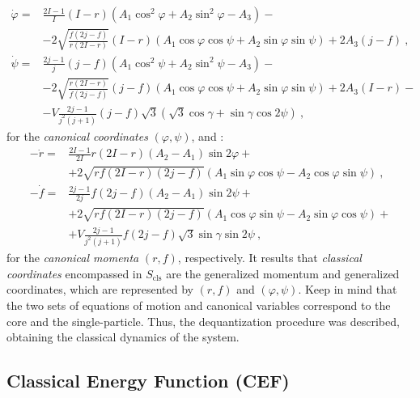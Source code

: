 \begin{align}
    \dot{\varphi}=&\frac{2I-1}{I}(I-r)\left(A_1\cos^2\varphi+A_2\sin^2\varphi-A_3\right)-\nonumber\\
                &-2\sqrt{\frac{f(2j-f)}{r(2I-r)}}(I-r)\left(A_1\cos\varphi\cos\psi+A_2\sin\varphi\sin\psi\right)+2A_3(j-f)\ ,\nonumber\\
    \dot{\psi}=&\frac{2j-1}{j}(j-f)\left(A_1\cos^2\psi+A_2\sin^2\psi-A_3\right)-\nonumber\\
                &-2\sqrt{\frac{r(2I-r)}{f(2j-f)}}(j-f)\left(A_1\cos\varphi\cos\psi+A_2\sin\varphi\sin\psi\right)+2A_3(I-r)-\nonumber\\
                &-V\frac{2j-1}{j^2(j+1)}(j-f)\sqrt{3}\left(\sqrt{3}\cos\gamma+\sin\gamma\cos2\psi\right)\ ,
    \label{eq-of-motion-explicit-coordinates}
\end{align}
for the \emph{canonical coordinates} $(\varphi,\psi)$, and \cite{raduta2020approach}:
\begin{align}
    -\dot{r}=&\frac{2I-1}{2I}r(2I-r)(A_2-A_1)\sin2\varphi+\nonumber\\
                &+2\sqrt{rf(2I-r)(2j-f)}\left(A_1\sin\varphi\cos\psi-A_2\cos\varphi\sin\psi\right)\ ,\nonumber\\
    -\dot{f}=&\frac{2j-1}{2j}f(2j-f)(A_2-A_1)\sin2\psi+\nonumber\\
                &+2\sqrt{rf(2I-r)(2j-f)}\left(A_1\cos\varphi\sin\psi-A_2\sin\varphi\cos\psi\right)+\nonumber\\
                &+V\frac{2j-1}{j^2(j+1)}f(2j-f)\sqrt{3}\sin\gamma\sin2\psi\ ,
    \label{eq-of-motion-explicit-momenta}
\end{align}
for the \emph{canonical momenta} $(r,f)$, respectively. It results that \emph{classical coordinates} encompassed in $S_\text{cls}$ are the generalized momentum and generalized coordinates, which are represented by $(r,f)$ and $(\varphi,\psi)$. Keep in mind that the two sets of equations of motion and canonical variables correspond to the core and the single-particle. Thus, the dequantization procedure was described, obtaining the classical dynamics of the system.

\subsection{Classical Energy Function (CEF)}
\label{classical-energy-function-subsection}

